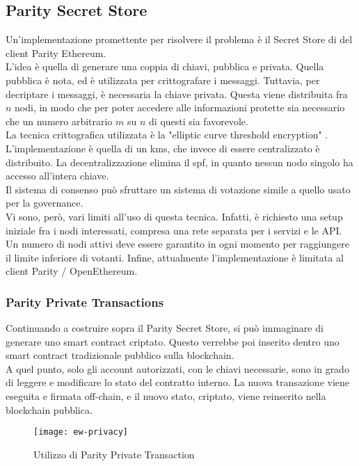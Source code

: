 \subsection{Parity Secret Store}
Un'implementazione promettente per risolvere il problema è il Secret Store di del client Parity Ethereum. \\
L'idea è quella di generare una coppia di chiavi, pubblica e privata.
Quella pubblica è nota, ed è utilizzata per crittografare i messaggi.
Tuttavia, per decriptare i messaggi, è necessaria la chiave privata.
Questa viene distribuita fra $n$ nodi, in modo che per poter accedere alle informazioni protette sia necessario che un numero arbitrario $m$ su $n$ di questi sia favorevole. \\
La tecnica crittografica utilizzata è la "elliptic curve threshold encryption" \cite{art:ecdkg}. \\
L'implementazione è quella di un \gls{kms}, che invece di essere centralizzato è distribuito.
La decentralizzazione elimina il \gls{spf}, in quanto nessun nodo singolo ha accesso all'intera chiave. \\
Il sistema di consenso può sfruttare un sistema di votazione simile a quello usato per la governance. \\
Vi sono, però, vari limiti all'uso di questa tecnica.
Infatti, è richiesto una setup iniziale fra i nodi interessati, compresa una rete separata per i servizi e le API.
Un numero di nodi attivi deve essere garantito in ogni momento per raggiungere il limite inferiore di votanti.
Infine, attualmente l'implementazione è limitata al client Parity / OpenEthereum.

\subsubsection{Parity Private Transactions}
Continuando a costruire sopra il Parity Secret Store, si può immaginare di generare uno smart contract criptato.
Questo verrebbe poi inserito dentro uno smart contract tradizionale pubblico sulla blockchain. \\
A quel punto, solo gli account autorizzati, con le chiavi necessarie, sono in grado di leggere e modificare lo stato del contratto interno.
La nuova transazione viene eseguita e firmata off-chain, e il nuovo stato, criptato, viene reinserito nella blockchain pubblica.

\begin{figure}[h]
    \texttt{[image: ew-privacy]}
    \centering
    \caption{Utilizzo di Parity Private Transaction \cite{img:ew-privacy}}
    \label{lab:ew-privacy}
\end{figure}

